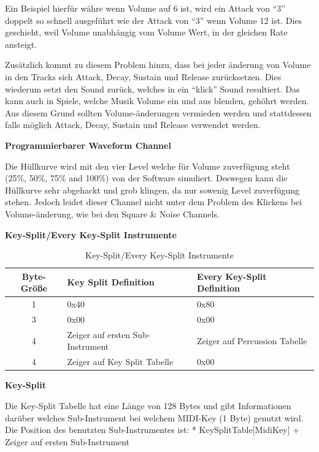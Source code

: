 \documentclass[11pt,a4paper]{scrartcl}
\newcommand{\paratitle}[1] {
    \vspace{5mm}
    \large \textbf{#1} \normalsize
    \vspace{2mm}\newline
}
\begin{document}
Ein Beispiel hierf\"ur w\"ahre wenn Volume auf 6 ist, wird ein Attack von \enquote{3} doppelt so schnell ausgef\"uhrt wie der Attack von \enquote{3} wenn Volume 12 ist. Dies geschieht, weil Volume unabh\"angig vom Volume Wert, in der gleichen Rate ansteigt.

Zus\"atzlich kommt zu diesem Problem hinzu, dass bei jeder \"anderung von Volume in den Tracks sich Attack, Decay, Sustain und Release zur\"ucksetzen. Dies wiederum setzt den Sound zur\"uck, welches in ein \enquote{klick} Sound resultiert. Das kann auch in Spiele, welche Musik Volume ein und aus blenden, geh\"ohrt werden. Aus diesem Grund sollten Volume-\"anderungen vermieden werden und stattdessen falls m\"oglich Attack, Decay, Sustain und Release verwendet werden.

\paratitle{Programmierbarer Waveform Channel}
Die H\"ullkurve wird mit den vier Level welche f\"ur Volume zuverf\"ugung steht (25\%, 50\%, 75\% and 100\%) von der Software simuliert. Deswegen kann die H\"ullkurve sehr abgehackt und grob klingen, da nur sowenig Level zuverf\"ugung stehen. Jedoch leidet dieser Channel nicht unter dem Problem des Klickens bei Volume-\"anderung, wie bei den Square \& Noise Channels.


\newpage
\paratitle{Key-Split/Every Key-Split Instrumente}

\begin{table}[h]
    \centering
    \begin{tabular}{ c | p{} | p{}}
        \textbf{Byte-Gr\"o{\ss}e} & \textbf{Key Split Definition} & \textbf{Every Key-Split Definition}\\
        \hline
        1 & 0x40 & 0x80\\
				\hline
        3 & 0x00 & 0x00\\
				\hline
        4 & Zeiger auf ersten Sub-Instrument & Zeiger auf Percussion Tabelle \\
				\hline
        4 & Zeiger auf Key Split Tabelle & 0x00\\
    \end{tabular}
    \caption{Key-Split/Every Key-Split Instrumente}
    \label{table:EveryKey-SplitInstrument}
\end{table}


\paratitle{Key-Split}
Die Key-Split Tabelle hat eine L\"ange von 128 Bytes und gibt Informationen dar\"uber welches Sub-Instrument bei welchem MIDI-Key (1 Byte) genutzt wird. 
Die Position des benutzten Sub-Instrumentes ist: * KeySplitTable[MidiKey] + Zeiger auf ersten Sub-Instrument
\end{document}
